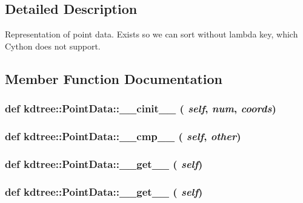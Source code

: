 \subsection{Detailed Description}
\begin{DoxyVerb}Representation of point data.  Exists so we can sort without lambda key, 
which Cython does not support.\end{DoxyVerb}
 

\subsection{Member Function Documentation}
\hypertarget{classkdtree_1_1PointData_a81cadc16da39464cc07f2e8f2e0eb11e}{
\subsubsection[{\_\-\_\-cinit\_\-\_\-}]{\setlength{\rightskip}{0pt plus 5cm}def kdtree::PointData::\_\-\_\-cinit\_\-\_\- ( {\em self}, \/   {\em num}, \/   {\em coords})}}
\label{classkdtree_1_1PointData_a81cadc16da39464cc07f2e8f2e0eb11e}
\hypertarget{classkdtree_1_1PointData_a430d24eb45b811759229bd33d0a705e7}{
\subsubsection[{\_\-\_\-cmp\_\-\_\-}]{\setlength{\rightskip}{0pt plus 5cm}def kdtree::PointData::\_\-\_\-cmp\_\-\_\- ( {\em self}, \/   {\em other})}}
\label{classkdtree_1_1PointData_a430d24eb45b811759229bd33d0a705e7}
\hypertarget{classkdtree_1_1PointData_a5000beba86f5112731c5cf9e7243541e}{
\subsubsection[{\_\-\_\-get\_\-\_\-}]{\setlength{\rightskip}{0pt plus 5cm}def kdtree::PointData::\_\-\_\-get\_\-\_\- ( {\em self})}}
\label{classkdtree_1_1PointData_a5000beba86f5112731c5cf9e7243541e}
\hypertarget{classkdtree_1_1PointData_a5000beba86f5112731c5cf9e7243541e}{
\subsubsection[{\_\-\_\-get\_\-\_\-}]{\setlength{\rightskip}{0pt plus 5cm}def kdtree::PointData::\_\-\_\-get\_\-\_\- ( {\em self})}}
